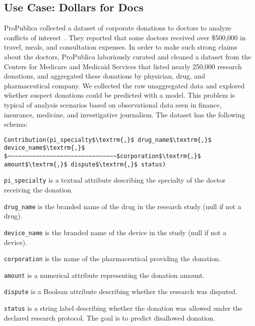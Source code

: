 \subsection{Use Case: Dollars for Docs}\label{s:usecase}
ProPublica collected a dataset of corporate donations to doctors to analyze conflicts of interest~\cite{dollarsfordocsa}. 
They reported that some doctors received over \$500,000 in travel, meals, and consultation expenses.
In order to make such strong claims about the doctors, ProPublica laboriously curated and cleaned a dataset from the Centers for Medicare and Medicaid Services that listed nearly 250,000 research donations, and aggregated these donations by physician, drug, and pharmaceutical company.
We collected the raw unaggregated data and explored whether suspect donations could be predicted with a model.
This problem is typical of analysis scenarios based on observational data seen in finance, insurance, medicine, and investigative journalism.
The dataset has the following schema:
\begin{lstlisting}[mathescape,basicstyle={\scriptsize}]
Contribution(pi_specialty$\textrm{,}$ drug_name$\textrm{,}$ device_name$\textrm{,}$
$~~~~~~~~~~~~~~~~~~~~~~~~~~~~~~~$corporation$\textrm{,}$ amount$\textrm{,}$ dispute$\textrm{,}$ status)
\end{lstlisting}

\noindent\texttt{pi\_specialty} is a textual attribute describing the specialty of the doctor receiving the donation.

\noindent\texttt{drug\_name} is the branded name of the drug in the research study (null if not a drug).

\noindent\texttt{device\_name} is the branded name of the device in the study (null if not a device).

\noindent\texttt{corporation} is the name of the pharmaceutical providing the donation.

\noindent\texttt{amount} is a numerical attribute representing the donation amount.

\noindent\texttt{dispute} is a Boolean attribute describing whether the research was disputed.

\noindent\texttt{status} is a string label describing whether the  donation was allowed under the declared research protocol. The goal is to predict disallowed  donation. 

\vspace{0.5em}

